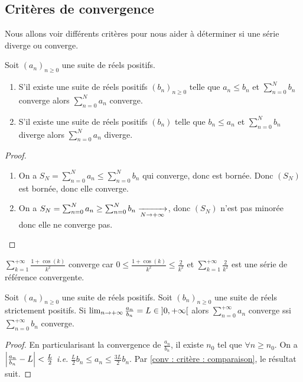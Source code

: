 \subsection*{Critères de convergence}
Nous allons voir différents critères pour nous aider à déterminer si une série diverge ou converge.
\begin{proposition}\label{conv : critère : comparaison}
Soit $(a_n)_{n\ge0}$ une suite de réels positifs.
\begin{enumerate}
    \item S'il existe une suite de réels positifs $(b_n)_{n\ge0}$ telle que $a_n\le b_n$ et $\sum_{n=0}^Nb_n$ converge alors $\sum_{n=0}^Na_n$ converge.
    \item S'il existe une suite de réels positifs $(b_n)$ telle que $b_n\le a_n$ et  $\sum_{n=0}^Nb_n$ diverge alors $\sum_{n=0}^Na_n$ diverge.
\end{enumerate}
\end{proposition}
\begin{proof}
    \begin{enumerate}
        \item On a $S_N = \sum_{n=0}^Na_n\le\sum_{n=0}^Nb_n$ qui converge, donc est bornée. Donc $(S_N)$ est bornée, donc elle converge.
        \item On a $S_N = \sum_{n=0}^Na_n\ge\sum_{n=0}^Nb_n\xrightarrow[N\to+\infty]{}$, donc $(S_N)$ n'est pas minorée donc elle ne converge pas.
    \end{enumerate}
\end{proof}
\begin{exemple}
    $\sum_{k=1}^{+\infty}\frac{1 + \cos(k)}{k^2}$ converge car $0\le\frac{1+\cos(k)}{k^2}\le \frac 2{k^2}$ et $\sum_{k=1}^{+\infty}\frac2{k^2}$ est une série de référence convergente.
\end{exemple}
\begin{proposition}
Soit $(a_n)_{n\ge0}$ une suite de réels positifs. Soit $(b_n)_{n\ge0}$ une suite de réels strictement positifs. Si $\lim_{n\to+\infty}\frac{a_n}{b_n} = L\in\left] 0,+\infty\right[$ alors $\sum_{n=0}^{+\infty}a_n$ converge ssi $\sum_{n=0}^{+\infty}b_n$ converge.
\end{proposition}
\begin{proof}
    En particularisant la convergence de $\frac{a_n}{b_n}$, il existe $n_0$ tel que $\forall n\ge n_0$. On a $\left| \frac{a_n}{b_n}-L \right|<\frac L2$ \textit{i.e.} $\frac{L}{2}b_n\le a_n\le\frac{3L}2b_n$. Par \ref{conv : critère : comparaison}, le résultat suit.
\end{proof}
